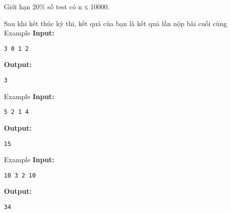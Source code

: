 Giới hạn  
20\% số test có n ≤ 10000.  

     Sau khi kết thúc kỳ thi, kết quả của bạn là kết quả lần nộp bài cuối cùng
   Example  
\textbf{    Input:   }
\begin{verbatim}
3 0 1 2\end{verbatim}

\textbf{    Output:   }
\begin{verbatim}
3\end{verbatim}
   Example  
\textbf{    Input:   }
\begin{verbatim}
5 2 1 4\end{verbatim}

\textbf{    Output:   }
\begin{verbatim}
15\end{verbatim}
   Example  
\textbf{    Input:   }
\begin{verbatim}
10 3 2 10\end{verbatim}

\textbf{    Output:   }
\begin{verbatim}
34\end{verbatim}